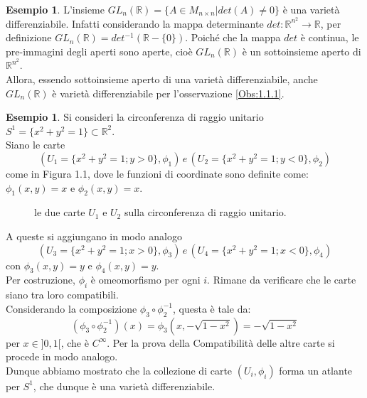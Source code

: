 \documentclass[12pt,a4paper]{report}
\theoremstyle{definition}
\theoremstyle{definition}
\newtheorem{Ex}[Def]{Esempio}
\theoremstyle{definition}
\theoremstyle{definition}
\begin{document}
\begin{Ex}
	L'insieme $GL_n(\mathbb{R})=\{A\in M_{n\times n}|det(A)\neq0\}$ è una varietà differenziabile.
	Infatti considerando la mappa determinante $det:\mathbb{R}^{n^2}\rightarrow \mathbb{R}$, per definizione $GL_n(\mathbb{R})=det^{-1}(\mathbb{R}-\{0\})$. Poiché che la mappa $det$ è continua, le pre-immagini degli aperti sono aperte, cioè $GL_n(\mathbb{R})$ è un sottoinsieme aperto di $\mathbb{R}^{n^2}$.\\
	Allora, essendo sottoinsieme aperto di una varietà differenziabile, anche $GL_n(\mathbb{R})$ è varietà differenziabile per l'osservazione \ref{Obs:1.1.1}.\\
\end{Ex}
\begin{Ex}
	Si consideri la circonferenza di raggio unitario $S^1=\{x^2+y^2=1\}\subset \mathbb{R}^2$.\\
	Siano le carte $$(U_1=\{x^2+y^2=1;y>0\},\phi_1) \, e \,  (U_2=\{x^2+y^2=1;y<0\},\phi_2)$$ come in Figura 1.1, dove le funzioni di coordinate sono definite come: $\phi_1(x,y)=x$ e $\phi_2(x,y)=x$.
	\begin{figure}[H]
		\centering
	\label{figura 1}
	\caption{le due carte $U_1$ e $U_2$ sulla circonferenza di raggio unitario.}
	\end{figure}
A queste si aggiungano in modo analogo $$(U_3=\{x^2+y^2=1;x>0\},\phi_3)\, e \, (U_4=\{x^2+y^2=1;x<0\},\phi_4)$$ con $\phi_3(x,y)=y$ e $\phi_4(x,y)=y$.\\
Per costruzione, $\phi_i$ è omeomorfismo per ogni $i$. Rimane da verificare che le carte siano tra loro compatibili.\\
Considerando la composizione $\phi_3\circ\phi_2^{-1}$, questa è tale da: $$(\phi_3\circ\phi_2^{-1})(x)=\phi_3(x,-\sqrt{1-x^2})=-\sqrt{1-x^2}$$ per $x\in ]0,1[$, che è $C^\infty$. Per la prova della Compatibilità delle altre carte si procede in modo analogo.\\ 
Dunque abbiamo mostrato che la collezione di carte $(U_i,\phi_i)$ forma un atlante per $S^1$, che dunque è una varietà differenziabile.
\end{Ex}
\end{document}

